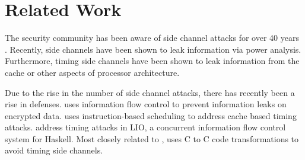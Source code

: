 \section{Related Work}
\label{sec:related}


The security community has been aware of side channel attacks for over 40 years
\cite{lampson1973, wray1991, lipner1975}. Recently, side channels have been
shown to leak information via power analysis\cite{Vaudenay2016}. Furthermore,
timing side channels have been shown to leak information from the
cache\cite{liu2015} or other aspects of processor architecture\cite{wang2004}.

Due to the rise in the number of side channel attacks, there has recently been a
rise in defenses. \cite{planul2013,mitchell2012} uses information flow control
to prevent information leaks on encrypted data. \cite{stefan2013} uses
instruction-based scheduling to address cache based timing attacks.
\cite{stefan2012,buiras2014} address timing attacks in LIO, a concurrent
information flow control system for Haskell. Most closely related to \constc,
\cite{molnar2005} uses C to C code transformations to avoid timing side
channels.
